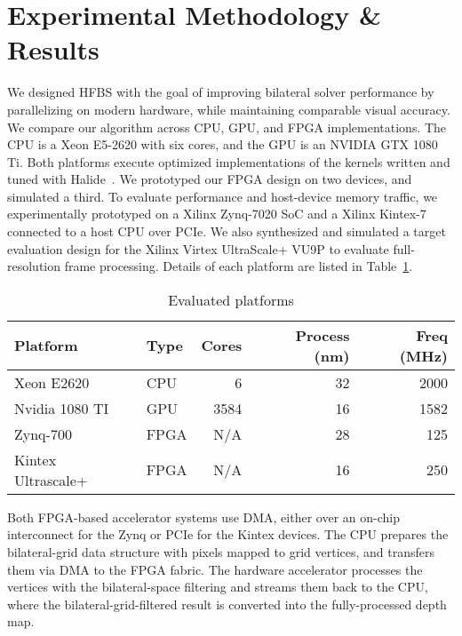 
\section{Experimental Methodology \& Results}
We designed HFBS with the goal of improving bilateral solver performance by parallelizing on modern hardware, while maintaining comparable visual accuracy.
We compare our algorithm across CPU, GPU, and FPGA implementations.
The CPU is a Xeon E5-2620 with six cores, and the GPU is an NVIDIA GTX 1080 Ti.
Both platforms execute optimized implementations of the kernels written and tuned with Halide~\cite{halide}.
We prototyped our FPGA design on two devices, and simulated a third.
To evaluate performance and host-device memory traffic, we experimentally prototyped on a Xilinx Zynq-7020 SoC and  a Xilinx Kintex-7 connected to a host CPU over PCIe.
We also synthesized and simulated a target evaluation design for the Xilinx Virtex UltraScale+ VU9P to evaluate full-resolution frame processing.
Details of each platform are listed in Table~\ref{evaluated-platforms}.

\begin{table}[h]
\centering
\caption{Evaluated platforms}
\begin{tabular}{@{}llrrr@{}}
\toprule
Platform & Type & Cores & Process (nm) & Freq (MHz) \\ \midrule
Xeon E2620 & CPU & 6 & 32 & 2000 \\
Nvidia 1080 TI & GPU & 3584 & 16 & 1582 \\
Zynq-700 & FPGA & N/A & 28 & 125 \\
Kintex Ultrascale+ & FPGA & N/A & 16 & 250 \\
\bottomrule
\end{tabular}
\label{evaluated-platforms}
\end{table}

Both FPGA-based accelerator systems use DMA, either over an on-chip interconnect for the Zynq or PCIe for the Kintex devices.
The CPU prepares the bilateral-grid data structure with pixels mapped to grid vertices, and transfers them via DMA to the FPGA fabric.
The hardware accelerator processes the vertices with the bilateral-space filtering and streams them back to the CPU, where the bilateral-grid-filtered result is converted into the fully-processed depth map.

